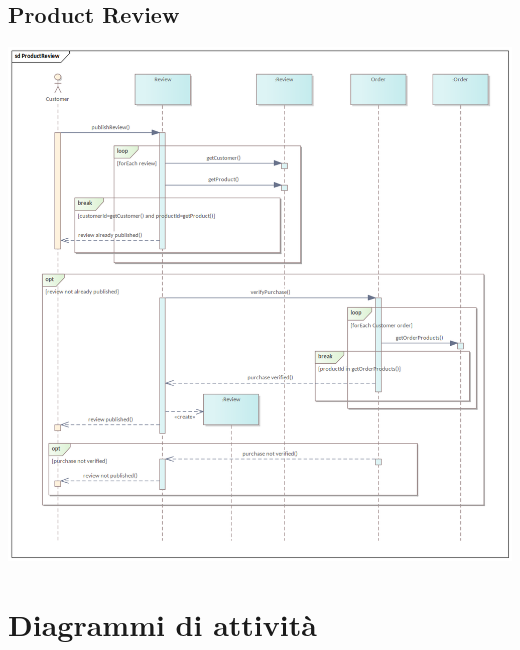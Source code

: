 \subsection{Product Review}
\begin{center}
  \includegraphics[width=\textwidth]{immagini/Analisi/SequenceDiagrams/ProductReview.png}
\end{center}

\section{Diagrammi di attività}
